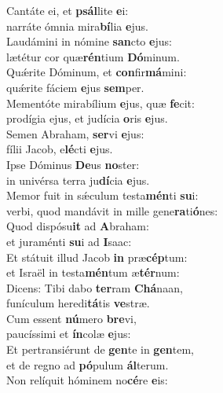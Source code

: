 \evenverse Cantáte ei, et \textbf{psál}lite \textbf{e}i:~\*\\
\evenverse narráte ómnia mira\textbf{bí}lia \textbf{e}jus.\\
\oddverse Laudámini in nómine \textbf{san}cto \textbf{e}jus:~\*\\
\oddverse lætétur cor quæ\textbf{rén}tium \textbf{Dó}minum.\\
\evenverse Quǽrite Dóminum, et \textbf{con}fir\textbf{má}mini:~\*\\
\evenverse quǽrite fáciem \textbf{e}jus \textbf{sem}per.\\
\oddverse Mementóte mirabílium \textbf{e}jus, quæ \textbf{fe}cit:~\*\\
\oddverse prodígia ejus, et judícia \textbf{o}ris \textbf{e}jus.\\
\evenverse Semen Abraham, \textbf{ser}vi \textbf{e}jus:~\*\\
\evenverse fílii Jacob, e\textbf{lé}cti \textbf{e}jus.\\
\oddverse Ipse Dóminus \textbf{De}us \textbf{no}ster:~\*\\
\oddverse in univérsa terra ju\textbf{dí}cia \textbf{e}jus.\\
\evenverse Memor fuit in sǽculum testa\textbf{mén}ti \textbf{su}i:~\*\\
\evenverse verbi, quod mandávit in mille gene\textbf{ra}ti\textbf{ó}nes:\\
\oddverse Quod dispósu\textbf{it} ad \textbf{A}braham:~\*\\
\oddverse et juraménti \textbf{su}i ad \textbf{I}saac:\\
\evenverse Et státuit illud Jacob \textbf{in} præ\textbf{cép}tum:~\*\\
\evenverse et Israël in testa\textbf{mén}tum æ\textbf{tér}num:\\
\oddverse Dicens: Tibi dabo \textbf{ter}ram \textbf{Chá}naan,~\*\\
\oddverse funículum heredi\textbf{tá}tis \textbf{ve}stræ.\\
\evenverse Cum essent \textbf{nú}mero \textbf{bre}vi,~\*\\
\evenverse paucíssimi et \textbf{ín}colæ \textbf{e}jus:\\
\oddverse Et pertransiérunt de \textbf{gen}te in \textbf{gen}tem,~\*\\
\oddverse et de regno ad \textbf{pó}pulum \textbf{ál}terum.\\
\evenverse Non relíquit hóminem no\textbf{cé}re \textbf{e}is:~\*\\
